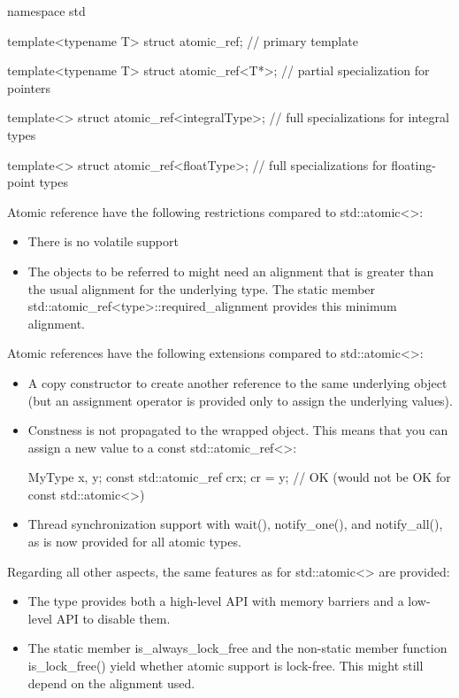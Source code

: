 \begin{cpp}
namespace std {
	template<typename T> struct atomic_ref; // primary template
	
	template<typename T> struct atomic_ref<T*>; // partial specialization for pointers
	
	template<> struct atomic_ref<integralType>; // full specializations for integral types
	
	template<> struct atomic_ref<floatType>; // full specializations for floating-point types
}
\end{cpp}

Atomic reference have the following restrictions compared to std::atomic<>:

\begin{itemize}
\item 
There is no volatile support

\item
The objects to be referred to might need an alignment that is greater than the usual alignment for the underlying type. The static member std::atomic\_ref<type>::required\_alignment provides this minimum alignment.
\end{itemize}

Atomic references have the following extensions compared to std::atomic<>:

\begin{itemize}
\item 
A copy constructor to create another reference to the same underlying object (but an assignment operator is provided only to assign the underlying values).

\item 
Constness is not propagated to the wrapped object. This means that you can assign a new value to a const std::atomic\_ref<>:

\begin{cpp}
MyType x, y;
const std::atomic_ref cr{x};
cr = y; // OK (would not be OK for const std::atomic<>)
\end{cpp}

\item 
Thread synchronization support with wait(), notify\_one(), and notify\_all(), as is now provided for all atomic types.
\end{itemize}

Regarding all other aspects, the same features as for std::atomic<> are provided:

\begin{itemize}
\item 
The type provides both a high-level API with memory barriers and a low-level API to disable them.

\item 
The static member is\_always\_lock\_free and the non-static member function is\_lock\_free() yield whether atomic support is lock-free. This might still depend on the alignment used.
\end{itemize}

